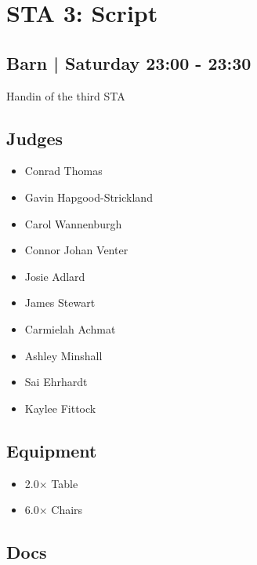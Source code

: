 \documentclass[10pt]{article}
\begin{document}
		\begin{minipage}{\linewidth}
		\setcounter{section}{26}
	\section{STA 3: Script }
	\subsection*{Barn | Saturday 23:00 - 23:30}

	Handin of the third STA

	\begin{multicols}{2}
	\subsection*{\faUsers \: Judges}
	\begin{itemize}
			\item Conrad Thomas
			\item Gavin Hapgood-Strickland
			\item Carol Wannenburgh
			\item Connor Johan Venter
			\item Josie Adlard
			\item James Stewart
			\item Carmielah Achmat
			\item Ashley Minshall
			\item Sai Ehrhardt
			\item Kaylee Fittock
		\end{itemize}
	\columnbreak
	\subsection*{\faWrench \: Equipment}
	
        \begin{itemize}
                    \item 2.0$\times$ \: Table
                    \item 6.0$\times$ \: Chairs
                \end{itemize}
                \vfill\null
        \subsection*{\faFile \: Docs}
     	\end{multicols}


	\vspace{1cm}
	\end{minipage}
\end{document}
